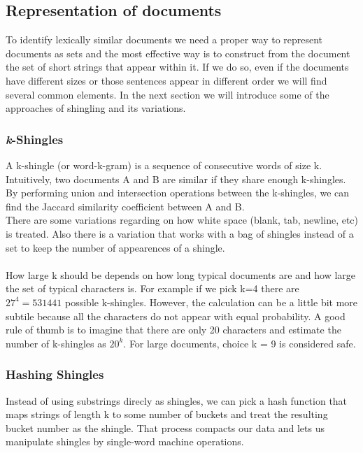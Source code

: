 \documentclass[12pt]{article}
\begin{document}
\subsection{Representation of documents}

To identify lexically similar documents we need a proper way to represent documents as sets and the most effective way is to construct from the document the set of short strings that appear within it. If we do so, even if the documents have different sizes or those sentences appear in different order we will find several common elements. In the next section we will introduce some of the approaches of shingling and its variations.

\subsubsection{\textit{k}-Shingles}

A k-shingle (or word-k-gram) is a sequence of consecutive words of size k. Intuitively, two documents A and B are similar if they share enough k-shingles. By performing union and intersection operations between the k-shingles, we can find the Jaccard similarity coefficient between A and B. 
\\
There are some variations regarding on how white space (blank, tab, newline, etc) is treated. Also there is a variation that works with a bag of shingles instead of a set to keep the number of appearences of a shingle. \medskip \\
\\
How large k should be depends on how long typical documents are and how large the set of typical characters is. For example if we pick k=4 there are $27^4=531441 $ possible k-shingles. However, the calculation can be a little bit more subtile because all the characters do not appear with equal probability. A good rule of thumb is to imagine that there are only 20 characters and estimate the number of k-shingles as $20^k$. For large documents, choice k = 9 is considered safe. 

\subsubsection{Hashing Shingles}

Instead of using substrings direcly as shingles, we can pick a hash function that maps strings of length k to some number of buckets and treat the resulting bucket number as the shingle. That process compacts our data and lets us manipulate shingles by single-word machine operations.
\end{document}
